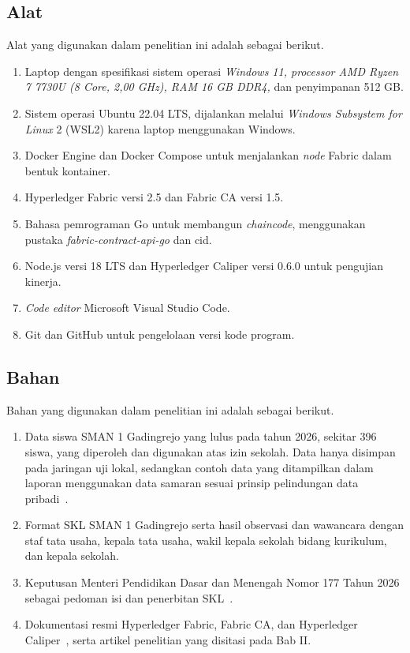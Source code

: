 \subsection{Alat}
Alat yang digunakan dalam penelitian ini adalah sebagai berikut.
\begin{enumerate}
    \item Laptop dengan spesifikasi sistem operasi \textit{Windows 11, processor AMD Ryzen 7 7730U (8 Core, 2,00 GHz), RAM 16 GB DDR4,} dan penyimpanan 512 GB.
    \item Sistem operasi Ubuntu 22.04 LTS, dijalankan melalui \textit{Windows Subsystem for Linux} 2 (WSL2) karena laptop menggunakan Windows.
    \item Docker Engine dan Docker Compose untuk menjalankan \textit{node} Fabric dalam bentuk kontainer.
    \item Hyperledger Fabric versi 2.5 dan Fabric CA versi 1.5.
    \item Bahasa pemrograman Go untuk membangun \textit{chaincode}, menggunakan pustaka \textit{fabric-contract-api-go} dan cid.
    \item Node.js versi 18 LTS dan Hyperledger Caliper versi 0.6.0 untuk pengujian kinerja.
    \item \textit{Code editor} Microsoft Visual Studio Code.
    \item Git dan GitHub untuk pengelolaan versi kode program.
\end{enumerate}

\subsection{Bahan}
Bahan yang digunakan dalam penelitian ini adalah sebagai berikut.
\begin{enumerate}
    \item Data siswa SMAN 1 Gadingrejo yang lulus pada tahun 2026, sekitar 396 siswa, yang diperoleh dan digunakan atas izin sekolah. Data hanya disimpan pada jaringan uji lokal, sedangkan contoh data yang ditampilkan dalam laporan menggunakan data samaran sesuai prinsip pelindungan data pribadi~\cite{UU27Tahun2022}.
    \item Format SKL SMAN 1 Gadingrejo serta hasil observasi dan wawancara dengan staf tata usaha, kepala tata usaha, wakil kepala sekolah bidang kurikulum, dan kepala sekolah.
    \item Keputusan Menteri Pendidikan Dasar dan Menengah Nomor 177 Tahun 2026 sebagai pedoman isi dan penerbitan SKL~\cite{Kepmendikdasmen2026SKL}.
    \item Dokumentasi resmi Hyperledger Fabric, Fabric CA, dan Hyperledger Caliper~\cite{FabricMSP,FabricCA,FabricPrivateData,Caliper}, serta artikel penelitian yang disitasi pada Bab II.
\end{enumerate}

